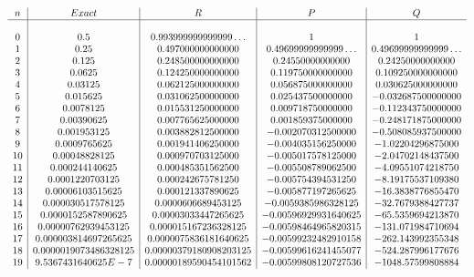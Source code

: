 \documentclass[10pt]{article} %
\begin{document}
\[
\begin{array}{c | c | c | c | c}
n & Exact & R & P & Q \\
\hline & & & & \\
0	&	0.5				&	0.993999999999999\ldots	 		&	1					&	1					\\
1	&	0.25				&	0.497000000000000			&	0.49699999999999\dots 		&	0.49699999999999\ldots 		\\
2	&	0.125				&	0.248500000000000			&	0.24550000000000			&	0.24250000000000			\\
3	&	0.0625			&	0.124250000000000			&	0.119750000000000		&	0.109250000000000		\\
4	&	0.03125			&	0.062125000000000			&	0.056875000000000		&	0.030625000000000		\\
5	&	0.015625			&	0.031062500000000			&	0.025437500000000		&	-0.032687500000000		\\
6	&	0.0078125			&	0.015531250000000			&	0.009718750000000		&	-0.112343750000000		\\
7	&	0.00390625			&	0.007765625000000			&	0.001859375000000		&	-0.248171875000000		\\
8	&	0.001953125		&	0.003882812500000			&	-0.002070312500000		&	-0.508085937500000		\\
9	&	0.0009765625		&	0.001941406250000			&	-0.004035156250000		&	-1.02204296875000		\\
10	&	0.00048828125		&	0.000970703125000			&	-0.005017578125000		&	-2.04702148437500		\\
11	&	0.000244140625		&	0.000485351562500			&	-0.005508789062500		&	-4.09551074218750		\\
12	&	0.0001220703125		&	0.000242675781250			&	-0.005754394531250		&	-8.19175537109380		\\
13	&	0.00006103515625		&	0.000121337890625			&	-0.005877197265625		&	-16.3838776855470		\\
14	&	0.000030517578125	&	0.0000606689453125			&	-0.0059385986328125		&	-32.7679388427737		\\
15	&	0.0000152587890625	&	0.00003033447265625			&	-0.00596929931640625		&	-65.5359694213870		\\
16	&	0.00000762939453125	&	0.000015167236328125			&	-0.00598464965820315		&	-131.071984710694		\\
17	&	0.000003814697265625	&	0.0000075836181640625			&	-0.00599232482910158		&	-262.143992355348		\\
18	&	0.0000019073486328125	&	0.00000379180908203125		&	-0.00599616241455077		&	-524.287996177676		\\
19	&	9.5367431640625E-7	&	0.00000189590454101562		&	-0.00599808120727536		&	-1048.57599808884
\end{array}
\]
\end{document}
